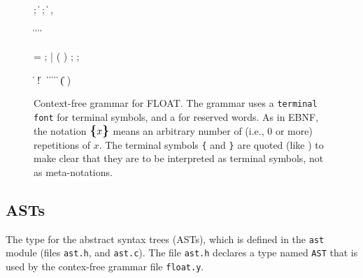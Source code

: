 \documentclass[11pt]{article}
\begin{document}
\begin{figure}
\begin{grammar}
 \:  

 \: 
 \:   ; \|   ;
 \:  \|  , 
 \:

 \:  \|  \| 
\> \| \>  \| 

 \:  =  ;
 \: \gramquote{\texttt{\{}}   \gramquote{\texttt{\}}}
 \:  |  
 \:  (  ) 
 \:   ;
 \:   ;

 \:  \|   
 \:  \| !~
 \:  \|   
 \:  \| 
 \:  \|   
 \:  \| 
 \:  \|  \| (  )
\end{grammar}
\caption{Context-free grammar for FLOAT.
  The grammar uses a \texttt{terminal font}
  for terminal symbols, and a  for reserved words.
  As in EBNF, the notation $\textrm{\textbf{\large{\{}}}x\textrm{\textbf{\large{\}}}}$ means an arbitrary number of
  (i.e., 0 or more) repetitions of $x$.
  The terminal symbols \texttt{\{} and \texttt{\}} are quoted
  (like \gramquote{\texttt{\{}}) to make clear that they are to be
  interpreted as terminal symbols, not as meta-notations.}
\label{fig:cf-grammar}
\end{figure}

\subsection{ASTs}
\label{sec:asts}

The type for the abstract syntax trees (ASTs),
which is defined in the \texttt{ast} module
(files \texttt{ast.h}, and \texttt{ast.c}).
The file \texttt{ast.h} declares a type named \texttt{AST} that is
used by the contex-free grammar file \texttt{float.y}.
\end{document}
